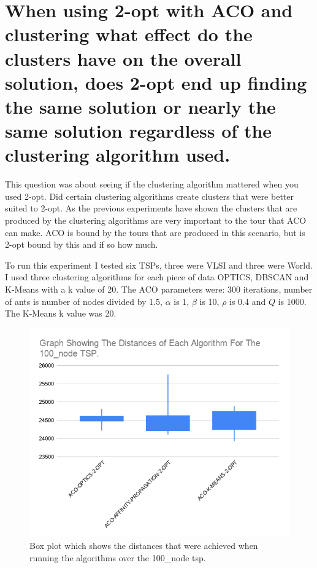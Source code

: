 \section{When using 2-opt with ACO and clustering what effect do the clusters have on the overall solution, does 2-opt end up finding the same solution or nearly the same solution regardless of the clustering algorithm used.}

This question was about seeing if the clustering algorithm mattered when you used 2-opt. Did certain clustering algorithms create clusters that were better suited to 2-opt. As the previous experiments have shown the clusters that are produced by the clustering algorithms are very important to the tour that ACO can make. ACO is bound by the tours that are produced in this scenario, but is 2-opt bound by this and if so how much.

To run this experiment I tested six TSPs, three were VLSI and three were World. I used three clustering algorithms for each piece of data OPTICS, DBSCAN and K-Means with a k value of 20. The ACO parameters were: 300 iterations, number of ants is number of nodes divided by 1.5, $\alpha$ is 1, $\beta$ is 10, $\rho$ is 0.4 and $Q$ is 1000. The K-Means k value was 20.

\begin{figure}
    \centering
    \includegraphics[width=\textwidth]{figures/tsp_distance_100_node_graph.png}
    \caption{Box plot which shows the distances that were achieved when running the algorithms over the 100\_node tsp.}
    \label{fig:tsp_distance_100_node_graph}
\end{figure}


